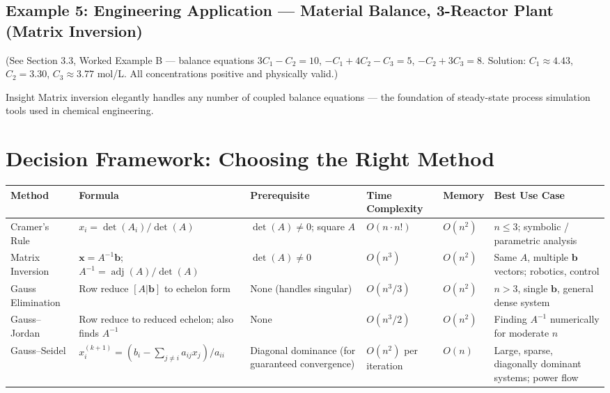 \documentclass[12pt,a4paper]{article}
\begin{document}
\subsection*{Example 5: Engineering Application --- Material Balance, 3-Reactor Plant (Matrix Inversion)}

(See Section 3.3, Worked Example B --- balance equations \(3C_1-C_2=10\), \(-C_1+4C_2-C_3=5\), \(-C_2+3C_3=8\). Solution: \(C_1 \approx 4.43\), \(C_2 = 3.30\), \(C_3 \approx 3.77\) mol/L. All concentrations positive and physically valid.)

\begin{learnbox}{Insight}
Matrix inversion elegantly handles any number of coupled balance equations --- the foundation of steady-state process simulation tools used in chemical engineering.
\end{learnbox}

\section{Decision Framework: Choosing the Right Method}

\begin{center}
\renewcommand{\arraystretch}{1.35}
\begin{tabular}{@{}p{2.8cm} p{2.8cm} p{2.4cm} p{2.2cm} p{1.8cm} p{2.8cm}@{}}
\toprule
\textbf{Method} & \textbf{Formula} & \textbf{Prerequisite} & \textbf{Time Complexity} & \textbf{Memory} & \textbf{Best Use Case} \\
\midrule
Cramer's Rule &
$x_i = \det(A_i)/\det(A)$ &
$\det(A)\neq0$; square $A$ &
$O(n \cdot n!)$ &
$O(n^2)$ &
$n\leq3$; symbolic / parametric analysis \\
\addlinespace
Matrix Inversion &
$\mathbf{x}=A^{-1}\mathbf{b}$; $A^{-1}=\operatorname{adj}(A)/\det(A)$ &
$\det(A)\neq0$ &
$O(n^3)$ &
$O(n^2)$ &
Same $A$, multiple $\mathbf{b}$ vectors; robotics, control \\
\addlinespace
Gauss Elimination &
Row reduce $[A|\mathbf{b}]$ to echelon form &
None (handles singular) &
$O(n^3/3)$ &
$O(n^2)$ &
$n>3$, single $\mathbf{b}$, general dense system \\
\addlinespace
Gauss--Jordan &
Row reduce to reduced echelon; also finds $A^{-1}$ &
None &
$O(n^3/2)$ &
$O(n^2)$ &
Finding $A^{-1}$ numerically for moderate $n$ \\
\addlinespace
Gauss--Seidel &
$x_i^{(k+1)} = (b_i - \sum_{j\neq i}a_{ij}x_j)/a_{ii}$ &
Diagonal dominance (for guaranteed convergence) &
$O(n^2)$ per iteration &
$O(n)$ &
Large, sparse, diagonally dominant systems; power flow \\
\bottomrule
\end{tabular}
\end{center}
\end{document}
